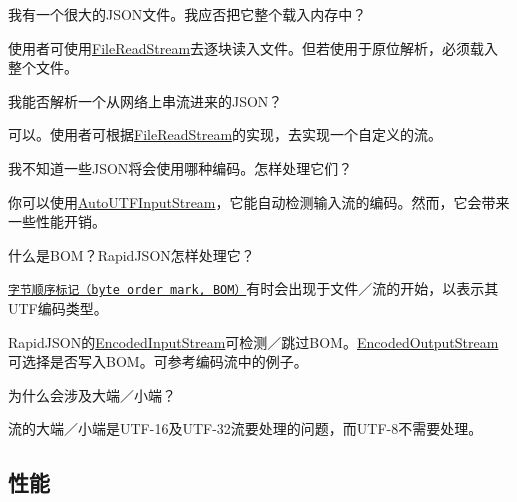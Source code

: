 \begin{DoxyEnumerate}
\item 我有一个很大的\+J\+S\+O\+N文件。我应否把它整个载入内存中？

使用者可使用{\ttfamily \hyperlink{class_file_read_stream}{File\+Read\+Stream}}去逐块读入文件。但若使用于原位解析，必须载入整个文件。
\item 我能否解析一个从网络上串流进来的\+J\+S\+O\+N？

可以。使用者可根据{\ttfamily \hyperlink{class_file_read_stream}{File\+Read\+Stream}}的实现，去实现一个自定义的流。
\item 我不知道一些\+J\+S\+O\+N将会使用哪种编码。怎样处理它们？

你可以使用{\ttfamily \hyperlink{class_auto_u_t_f_input_stream}{Auto\+U\+T\+F\+Input\+Stream}}，它能自动检测输入流的编码。然而，它会带来一些性能开销。
\item 什么是\+B\+O\+M？\+Rapid\+J\+S\+O\+N怎样处理它？

\href{http://en.wikipedia.org/wiki/Byte_order_mark}{\tt 字节顺序标记（byte order mark, B\+O\+M）}有时会出现于文件／流的开始，以表示其\+U\+T\+F编码类型。

Rapid\+J\+S\+O\+N的{\ttfamily \hyperlink{class_encoded_input_stream}{Encoded\+Input\+Stream}}可检测／跳过\+B\+O\+M。{\ttfamily \hyperlink{class_encoded_output_stream}{Encoded\+Output\+Stream}}可选择是否写入\+B\+O\+M。可参考编码流中的例子。
\item 为什么会涉及大端／小端？

流的大端／小端是\+U\+T\+F-\/16及\+U\+T\+F-\/32流要处理的问题，而\+U\+T\+F-\/8不需要处理。
\end{DoxyEnumerate}

\subsection*{性能}


